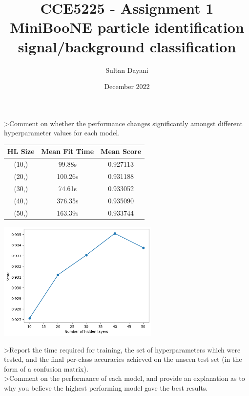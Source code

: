 \documentclass[12pt, letterpaper]{article}
\title{CCE5225 - Assignment 1 \\
\large MiniBooNE particle identification \\ signal/background classification}
\author{Sultan Dayani}
\date{December 2022}
\begin{document}
\maketitle
\pagebreak

\textgreater{Comment on whether the performance changes significantly amongst different hyperparameter values for each model.}
\\

\begin{tabular}{|c c c|}
\hline
HL Size & Mean Fit Time & Mean Score \\ [0.5ex] 
\hline
(10,) & 99.88s & 0.927113 \\
\hline
(20,) & 100.26s & 0.931188 \\
\hline
(30,) & 74.61s & 0.933052 \\
\hline
(40,) & 376.35s & 0.935090 \\
\hline
(50,) & 163.39s & 0.933744 \\ 
\hline
\end{tabular}

\includegraphics[width=0.6\textwidth]{1hiddenlayer_scores.png}

\textgreater{Report the time required for training, the set of hyperparameters which were tested, and the final per-class accuracies achieved on the unseen test set (in the form of a confusion matrix).}
\\

\textgreater{Comment on the performance of each model, and provide an explanation as to why you believe the highest performing model gave the best results.}
\end{document}
